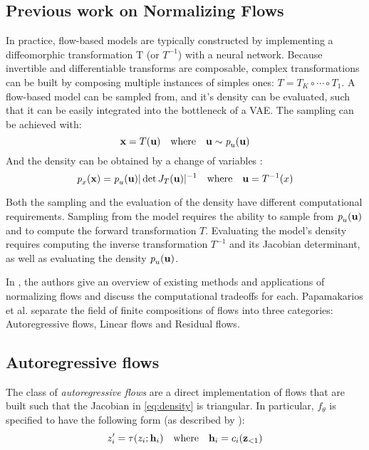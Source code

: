 \documentclass[english]{scrartcl}
\begin{document}
    \subsection{Previous work on Normalizing Flows}
    In practice, flow-based models are typically constructed by implementing a diffeomorphic transformation T (or $T^{-1}$) with a neural network.
    Because invertible and differentiable transforms are composable, complex transformations can be built by composing multiple instances of simples ones: $T=T_K \circ \cdots \circ T_1$.
    A flow-based model can be sampled from, and it's density can be evaluated, such that it can be easily integrated into the bottleneck of a VAE.
    The sampling can be achieved with:
    \begin{equation}
        \textbf{x} = T(\textbf{u}) \quad \text{where} \quad \textbf{u} \sim \textit{p}_u (\textbf{u})
    \end{equation}
    And the density can be obtained by a change of variables \parencite{bogachev2007measure}:
    \begin{equation}
        \label{eq:density}
        \textit{p}_x (\textbf{x}) = \textit{p}_u (\textbf{u}) |\det J_T(\textbf{u})|^{-1} \quad \text{where} \quad \textbf{u} = T^{-1}(x)
    \end{equation}

    Both the sampling and the evaluation of the density have different computational requirements.
    Sampling from the model requires the ability to sample from $\textit{p}_u (\textbf{u})$ and to compute the forward transformation $T$.
    Evaluating the model's density requires computing the inverse transformation $T^{-1}$ and its Jacobian determinant, as well as evaluating the density $\textit{p}_u (\textbf{u})$.

    In \cite{papamakarios_normalizing_2019}, the authors give an overview of existing methods and applications of normalizing flows and discuss the computational tradeoffs for each.
    Papamakarios et al. separate the field of finite compositions of flows into three categories: Autoregressive flows, Linear flows and Residual flows.

    \subsection{Autoregressive flows}
    The class of \textit{autoregressive flows} are a direct implementation of flows that are built such that the Jacobian in \cref{eq:density} is triangular.
    In particular, $f_{\theta}$ is specified to have the following form (as described by \cite{papamakarios_normalizing_2019}):
    \begin{equation}
        z_i^{\prime} = \tau(z_i;\textbf{h}_i) \quad \text{where} \quad \textbf{h}_i = c_i(\textbf{z}_{<1})
    \end{equation}
\end{document}
